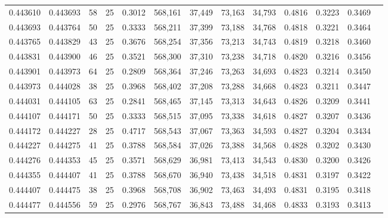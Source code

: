 \begin{tabular}{rrrrrrrrrrrrr}
0.443610 & 0.443693 &    58 &  25 &                                     0.3012 & 568,161 &  37,449 &  73,163 &  34,793 & 0.4816 & 0.3223 & 0.3469 \\
0.443693 & 0.443764 &    50 &  25 &                                     0.3333 & 568,211 &  37,399 &  73,188 &  34,768 & 0.4818 & 0.3221 & 0.3464 \\
0.443765 & 0.443829 &    43 &  25 &                                     0.3676 & 568,254 &  37,356 &  73,213 &  34,743 & 0.4819 & 0.3218 & 0.3460 \\
0.443831 & 0.443900 &    46 &  25 &                                     0.3521 & 568,300 &  37,310 &  73,238 &  34,718 & 0.4820 & 0.3216 & 0.3456 \\
0.443901 & 0.443973 &    64 &  25 &                                     0.2809 & 568,364 &  37,246 &  73,263 &  34,693 & 0.4823 & 0.3214 & 0.3450 \\
0.443973 & 0.444028 &    38 &  25 &                                     0.3968 & 568,402 &  37,208 &  73,288 &  34,668 & 0.4823 & 0.3211 & 0.3447 \\
0.444031 & 0.444105 &    63 &  25 &                                     0.2841 & 568,465 &  37,145 &  73,313 &  34,643 & 0.4826 & 0.3209 & 0.3441 \\
0.444107 & 0.444171 &    50 &  25 &                                     0.3333 & 568,515 &  37,095 &  73,338 &  34,618 & 0.4827 & 0.3207 & 0.3436 \\
0.444172 & 0.444227 &    28 &  25 &                                     0.4717 & 568,543 &  37,067 &  73,363 &  34,593 & 0.4827 & 0.3204 & 0.3434 \\
0.444227 & 0.444275 &    41 &  25 &                                     0.3788 & 568,584 &  37,026 &  73,388 &  34,568 & 0.4828 & 0.3202 & 0.3430 \\
0.444276 & 0.444353 &    45 &  25 &                                     0.3571 & 568,629 &  36,981 &  73,413 &  34,543 & 0.4830 & 0.3200 & 0.3426 \\
0.444355 & 0.444407 &    41 &  25 &                                     0.3788 & 568,670 &  36,940 &  73,438 &  34,518 & 0.4831 & 0.3197 & 0.3422 \\
0.444407 & 0.444475 &    38 &  25 &                                     0.3968 & 568,708 &  36,902 &  73,463 &  34,493 & 0.4831 & 0.3195 & 0.3418 \\
0.444477 & 0.444556 &    59 &  25 &                                     0.2976 & 568,767 &  36,843 &  73,488 &  34,468 & 0.4833 & 0.3193 & 0.3413 \\

\end{tabular}
